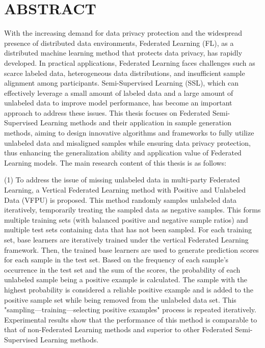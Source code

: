 



\chapter{ABSTRACT}
\xiaosi

With the increasing demand for data privacy protection and the widespread presence of distributed data environments, Federated Learning (FL), as a distributed machine learning method that protects data privacy, has rapidly developed. In practical applications, Federated Learning faces challenges such as scarce labeled data, heterogeneous data distributions, and insufficient sample alignment among participants. Semi-Supervised Learning (SSL), which can effectively leverage a small amount of labeled data and a large amount of unlabeled data to improve model performance, has become an important approach to address these issues. This thesis focuses on Federated Semi-Supervised Learning methods and their application in sample generation methods, aiming to design innovative algorithms and frameworks to fully utilize unlabeled data and misaligned samples while ensuring data privacy protection, thus enhancing the generalization ability and application value of Federated Learning models. The main research content of this thesis is as follows:

(1) To address the issue of missing unlabeled data in multi-party Federated Learning, a Vertical Federated Learning method with Positive and Unlabeled Data (VFPU) is proposed. This method randomly samples unlabeled data iteratively, temporarily treating the sampled data as negative samples. This forms multiple training sets (with balanced positive and negative sample ratios) and multiple test sets containing data that has not been sampled. For each training set, base learners are iteratively trained under the vertical Federated Learning framework. Then, the trained base learners are used to generate prediction scores for each sample in the test set. Based on the frequency of each sample's occurrence in the test set and the sum of the scores, the probability of each unlabeled sample being a positive example is calculated. The sample with the highest probability is considered a reliable positive example and is added to the positive sample set while being removed from the unlabeled data set. This "sampling—training—selecting positive examples" process is repeated iteratively. Experimental results show that the performance of this method is comparable to that of non-Federated Learning methods and superior to other Federated Semi-Supervised Learning methods.

